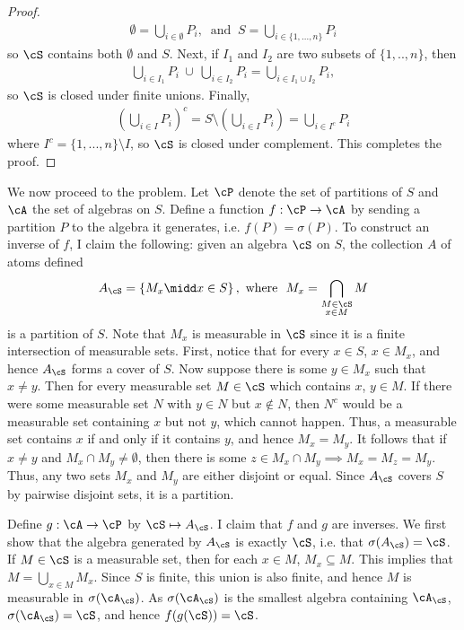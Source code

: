 \begin{homework}[e]
\begin{prf}
\begin{enumerate}[(1)]
\begin{proof}
					\begin{align*}
						\emptyset = \bigcup_{i\in \emptyset} P_i, ~\text{ and  }~ S = \bigcup_{i \in \{1,...,n\}} P_i
					\end{align*}
					so $\cS$ contains both $\emptyset$ and $S$. Next, if $I_1$ and $I_2$ are two subsets of $\{1,..,n\}$, then
					\begin{align*}
						\bigcup_{i \in I_1} P_i ~ \cup ~ \bigcup_{i \in I_2} P_i = \bigcup_{i \in I_1 \cup I_2} P_i,
					\end{align*}
					so $\cS$ is closed under finite unions. Finally,
					\begin{align*}
						\left(\bigcup_{i \in I} P_i\right)^c = S \setminus \left(\bigcup_{i \in I} P_i\right) = \bigcup_{i\in I^c} P_i
					\end{align*}
					where $I^c = \{1,...,n\}\setminus I$, so $\cS$ is closed under complement. This completes the proof. 
				\end{proof}

				We now proceed to the problem. Let $\cP$ denote the set of partitions of $S$ and $\cA$ the set of algebras on $S$. Define a function $f:\cP \to \cA$ by sending a partition $P$ to the algebra it generates, i.e. $f(P) = \sigma(P)$. To construct an inverse of $f$, I claim the following: given an algebra $\cS$ on $S$, the collection $A$ of atoms defined
				\begin{align*}
					A_\cS = \left\{M_x\midd x \in S\right\}, \text{ where } ~ M_x = \bigcap_{\substack{M \in \cS \\ x \in M}} M
				\end{align*}
				is a partition of $S$. Note that $M_x$ is measurable in $\cS$ since it is a finite intersection of measurable sets. First, notice that for every $x \in S$, $x \in M_x$, and hence $A_\cS$ forms a cover of $S$. Now suppose there is some $y \in M_x$ such that $x \neq y$. Then for every measurable set $M \in \cS$ which contains $x$, $y \in M$. If there were some measurable set $N$ with $y \in N$ but $x \not\in N$, then $N^c$ would be a measurable set containing $x$ but not $y$, which cannot happen. Thus, a measurable set contains $x$ if and only if it contains $y$, and hence $M_x = M_y$. It follows that if $x \neq y$ and $M_x \cap M_y \neq \emptyset$, then there is some $z \in M_x \cap M_y \implies M_x = M_z = M_y$. Thus, any two sets $M_x$ and $M_y$ are either disjoint or equal. Since $A_\cS$ covers $S$ by pairwise disjoint sets, it is a partition.


				Define $g:\cA\to \cP$ by $\cS \mapsto A_\cS$. I claim that $f$ and $g$ are inverses. We first show that the algebra generated by $A_\cS$ is exactly $\cS$, i.e. that $\sigma(A_\cS) = \cS$. If $M \in \cS$ is a measurable set, then for each $x \in M$, $M_x \subseteq M$. This implies that $M = \bigcup_{x \in M}M_x$. Since $S$ is finite, this union is also finite, and hence $M$ is measurable in $\sigma(\cA_\cS)$. As $\sigma(\cA_\cS)$ is the smallest algebra containing $\cA_\cS$, $\sigma(\cA_\cS) = \cS$, and hence $f(g(\cS)) = \cS$.


\end{enumerate}
\end{prf}
\end{homework}
